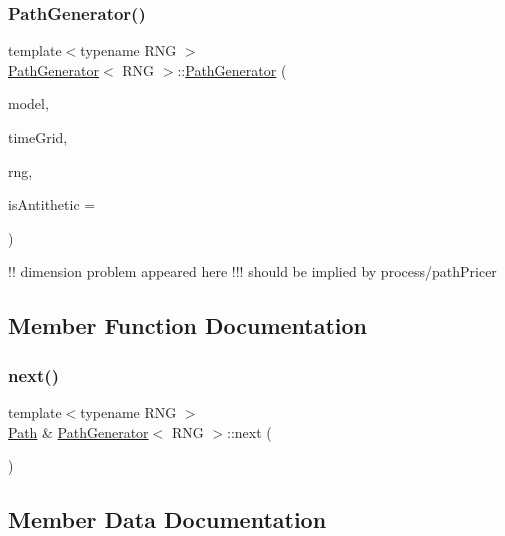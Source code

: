\subsubsection{\texorpdfstring{Path\+Generator()}{PathGenerator()}}
{\footnotesize\ttfamily template$<$typename R\+NG $>$ \\
\hyperlink{class_path_generator}{Path\+Generator}$<$ R\+NG $>$\+::\hyperlink{class_path_generator}{Path\+Generator} (\begin{DoxyParamCaption}\item[{const std\+::shared\+\_\+ptr$<$ \hyperlink{class_model}{Model} $>$}]{model,  }\item[{const vector$<$ \hyperlink{_name_def_8h_ac2d3e0ba793497bcca555c7c2cf64ff3}{Time} $>$ \&}]{time\+Grid,  }\item[{R\+NG}]{rng,  }\item[{bool}]{is\+Antithetic = {} }\end{DoxyParamCaption})}

!! dimension problem appeared here !!! should be implied by process/path\+Pricer 

\subsection{Member Function Documentation}
\hypertarget{class_path_generator_a848a4f432d86df5b03d835d99472ab37}{}\label{class_path_generator_a848a4f432d86df5b03d835d99472ab37} 
\subsubsection{\texorpdfstring{next()}{next()}}
{\footnotesize\ttfamily template$<$typename R\+NG $>$ \\
\hyperlink{class_path}{Path} \& \hyperlink{class_path_generator}{Path\+Generator}$<$ R\+NG $>$\+::next (\begin{DoxyParamCaption}{ }\end{DoxyParamCaption})}



\subsection{Member Data Documentation}
\hypertarget{class_path_generator_aa45100f04c27cd0f25c059c410316346}{}\label{class_path_generator_aa45100f04c27cd0f25c059c410316346} 
